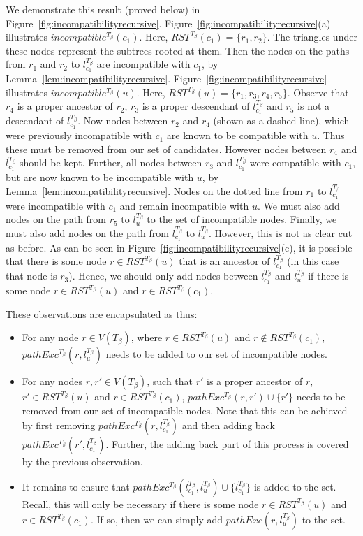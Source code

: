 \documentclass{article}
\newcommand{\TB}{T_\beta}
\begin{document}
    We demonstrate this result (proved below) in Figure~\ref{fig:incompatibilityrecursive}. Figure~\ref{fig:incompatibilityrecursive}(a) illustrates $incompatible^{\TB}(c_1)$. Here, $RST^{\TB}(c_1) = \{r_1, r_2\}$. The triangles under these nodes represent the subtrees rooted at them. Then the nodes on the paths from $r_1$ and $r_2$ to $l_{c_1}^{\TB}$ are incompatible with $c_1$, by Lemma~\ref{lem:incompatibilityrecursive}. Figure~\ref{fig:incompatibilityrecursive} illustrates $incompatible^{\TB}(u)$. Here, $RST^{\TB}(u) = \{r_1, r_3, r_4, r_5\}$. Observe that $r_4$ is a proper ancestor of $r_2$, $r_3$ is a proper descendant of $l_{c_1}^{\TB}$ and $r_5$ is not a descendant of $l_{c_1}^{\TB}$. Now nodes between $r_2$ and $r_4$ (shown as a dashed line), which were previously incompatible with $c_1$ are known to be compatible with $u$. Thus these must be removed from our set of candidates. However nodes between $r_4$ and $l_{c_1}^{\TB}$ should be kept. Further, all nodes between $r_3$ and $l_{c_1}^{\TB}$ were compatible with $c_1$, but are now known to be incompatible with $u$, by Lemma~\ref{lem:incompatibilityrecursive}. Nodes on the dotted line from $r_1$ to $l_{c_1}^{\TB}$ were incompatible with $c_1$ and remain incompatible with $u$. We must also add nodes on the path from $r_5$ to $l_u^{\TB}$ to the set of incompatible nodes. Finally, we must also add nodes on the path from $l_{c_1}^{\TB}$ to $l_u^{\TB}$. However, this is not as clear cut as before. As can be seen in Figure~\ref{fig:incompatibilityrecursive}(c), it is possible that there is some node $r \in RST^{\TB}(u)$ that is an ancestor of $l_{c_1}^{\TB}$ (in this case that node is $r_3$). Hence, we should only add nodes between $l_{c_1}^{\TB}$ and $l_u^{\TB}$ if there is some node $r \in RST^{\TB}(u)$ and $r \in RST^{\TB}(c_1)$.

    These observations are encapsulated as thus:
    \begin{itemize}
        \item For any node $r \in V(\TB)$, where $r \in RST^{\TB}(u)$ and $r \not\in RST^{\TB}(c_1)$, $pathExc^{\TB}(r, l_u^{\TB})$ needs to be added to our set of incompatible nodes.

        \item For any nodes $r, r' \in V(\TB)$, such that $r'$ is a proper ancestor of $r$, $r' \in RST^{\TB}(u)$ and $r \in RST^{\TB}(c_1)$, $pathExc^{\TB}(r, r') \cup \{r'\}$ needs to be removed from our set of incompatible nodes. Note that this can be achieved by first removing $pathExc^{\TB}(r, l_{c_1}^{\TB})$ and then adding back $pathExc^{\TB}(r', l_{c_1}^{\TB})$. Further, the adding back part of this process is covered by the previous observation.

        \item It remains to ensure that $pathExc^{\TB}(l_{c_1}^{\TB}, l_u^{\TB}) \cup \{l_{c_1}^{\TB}\}$ is added to the set. Recall, this will only be necessary if there is some node $r \in RST^{\TB}(u)$ and $r \in RST^{\TB}(c_1)$. If so, then we can simply add $pathExc(r, l_u^{\TB})$ to the set.
    \end{itemize}
\end{document}
